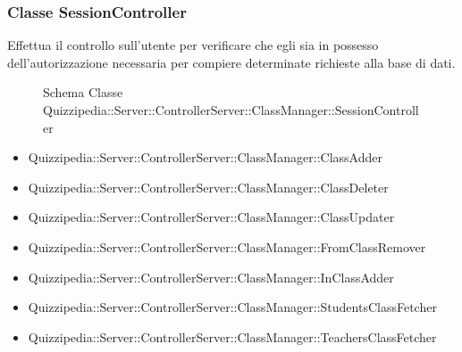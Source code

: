 \subsubsection{Classe SessionController}
Effettua il controllo sull'utente per verificare che egli sia in possesso dell'autorizzazione necessaria per compiere determinate richieste alla base di dati.
\begin{figure}[H]
\centering
\noindent{}
\caption{Schema Classe Quizzipedia::Server::ControllerServer::ClassManager::SessionController}
\end{figure}
\begin{itemize}
\item Quizzipedia::Server::ControllerServer::ClassManager::ClassAdder
\item Quizzipedia::Server::ControllerServer::ClassManager::ClassDeleter
\item Quizzipedia::Server::ControllerServer::ClassManager::ClassUpdater
\item Quizzipedia::Server::ControllerServer::ClassManager::FromClassRemover
\item Quizzipedia::Server::ControllerServer::ClassManager::InClassAdder
\item Quizzipedia::Server::ControllerServer::ClassManager::StudentsClassFetcher
\item Quizzipedia::Server::ControllerServer::ClassManager::TeachersClassFetcher
\end{itemize}

